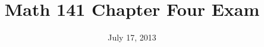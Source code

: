 \documentclass[fleqn,addpoints]{exam}
\title{Math 141 Chapter Four Exam}
\date{July 17, 2013}
\author{}
\begin{document}
  \maketitle  


  \ifprintanswers
  \else
    \begin{center}
      \gradetable[h][pages]
      \bonusgradetable[h][pages]
    \end{center}
  \fi


\end{document}
